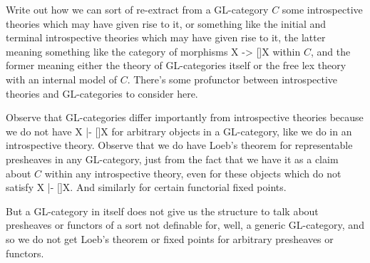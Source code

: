 \begin{TODOblock}
Write out how we can sort of re-extract from a GL-category $C$ some introspective theories which may have given rise to it, or something like the initial and terminal introspective theories which may have given rise to it, the latter meaning something like the category of morphisms X -> []X within $C$, and the former meaning either the theory of GL-categories itself or the free lex theory with an internal model of $C$. There's some profunctor between introspective theories and GL-categories to consider here.
\end{TODOblock}

\begin{TODOblock}
Observe that GL-categories differ importantly from introspective theories because we do not have X |- []X for arbitrary objects in a GL-category, like we do in an introspective theory. Observe that we do have Loeb's theorem for representable presheaves in any GL-category, just from the fact that we have it as a claim about $C$ within any introspective theory, even for these objects which do not satisfy X |- []X. And similarly for certain functorial fixed points.

But a GL-category in itself does not give us the structure to talk about presheaves or functors of a sort not definable for, well, a generic GL-category, and so we do not get Loeb's theorem or fixed points for arbitrary presheaves or functors.
\end{TODOblock}